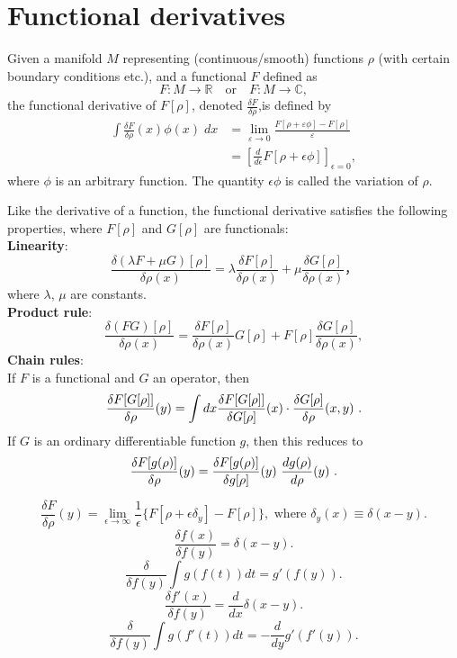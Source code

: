 \section{Functional derivatives}
\begin{newdef}
	Given a manifold $M$ representing (continuous/smooth) functions $\rho$ (with certain boundary conditions etc.), and a functional $F$ defined as
	\[F\colon M\rightarrow \mathbb {R}  \quad {\mbox{or}} \quad F\colon M\rightarrow \mathbb {C} ,\]
	the functional derivative of $F[\rho]$, denoted $\frac{\delta F}{\delta \rho}$,is defined by
	\[{\begin{aligned}\int {\frac {\delta F}{\delta \rho }}(x)\phi (x)\;dx&=\lim _{\varepsilon \to 0}{\frac {F[\rho +\varepsilon \phi ]-F[\rho ]}{\varepsilon }}\\&=\left[{\frac {d}{d\epsilon }}F[\rho +\epsilon \phi ]\right]_{\epsilon =0},\end{aligned}}\]
	where $\phi$ is an arbitrary function. The quantity $\epsilon \phi$ is called the variation of $\rho$.
\end{newdef}
\noindent
Like the derivative of a function, the functional derivative satisfies the following properties, where $F[\rho]$ and $G[\rho]$ are functionals:\\
{\bf Linearity}:
\[{\frac {\delta (\lambda F+\mu G)[\rho ]}{\delta \rho (x)}}=\lambda {\frac {\delta F[\rho ]}{\delta \rho (x)}}+\mu {\frac {\delta G[\rho ]}{\delta \rho (x)}}，\]
where $\lambda$, $\mu$ are constants.\\
{\bf Product rule}:
\[{\frac {\delta (FG)[\rho ]}{\delta \rho (x)}}={\frac {\delta F[\rho ]}{\delta \rho (x)}}G[\rho ]+F[\rho ]{\frac {\delta G[\rho ]}{\delta \rho (x)}},\]
{\bf Chain rules}:\\
If $F$ is a functional and $G$ an operator, then
\[{\displaystyle \displaystyle {\frac {\delta F[G[\rho ]]}{\delta \rho }(y)}=\int dx{\frac {\delta F[G[\rho]]}{\delta G[\rho]}}(x)\cdot {\frac {\delta G[\rho ]}{\delta \rho}(x,y)}\ }.\]
If $G$ is an ordinary differentiable function $g$, then this reduces to
\[{\displaystyle \displaystyle {\frac {\delta F[g(\rho )]}{\delta \rho}(y)}={\frac {\delta F[g(\rho )]}{\delta g[\rho ]}(y)}\ {\frac {dg(\rho )}{d\rho }(y)}\ } .\]
\begin{newprop}
	\[\frac{\delta F}{\delta \rho} (y) = \lim_{\epsilon \to \infty} \frac{1}{\epsilon} \{ F[\rho + \epsilon \delta_y] - F[\rho] \}, \mbox{ where }\delta_y(x) \equiv \delta(x-y).\]
	\[\frac{\delta f(x)}{\delta f(y)} = \delta(x-y).\]
	\[\frac{\delta}{\delta f(y)} \int g\left( f(t)\right) dt =  g'(f(y)).\]
	\[\frac{\delta f'(x)}{\delta f(y)} = \frac{d}{dx}\delta(x-y).\]
	\[\frac{\delta}{\delta f(y)} \int g\left( f'(t)\right) dt = -\frac{d}{dy} g'(f'(y)).\]
\end{newprop}


